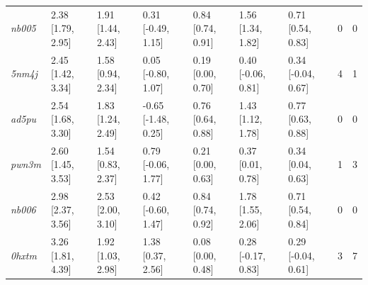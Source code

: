 \documentclass[9pt,lineno,final]{elife}
\begin{document}
\begin{table}[tb!]
\begin{center}
\begin{threeparttable}
\begin{tabular}{@{}lllllllll@{}}
\textit{nb005} & 2.38 [1.79, 2.95] & 1.91 [1.44, 2.43] & 0.31 [-0.49, 1.15] & 0.84 [0.74, 0.91] & 1.56 [1.34, 1.82] & 0.71 [0.54, 0.83] & 0 & 0 \\
\textit{5nm4j} & 2.45 [1.42, 3.34] & 1.58 [0.94, 2.34] & 0.05 [-0.80, 1.07] & 0.19 [0.00, 0.70] & 0.40 [-0.06, 0.81] & 0.34 [-0.04, 0.67] & 4 & 1 \\
\textit{ad5pu} & 2.54 [1.68, 3.30] & 1.83 [1.24, 2.49] & -0.65 [-1.48, 0.25] & 0.76 [0.64, 0.88] & 1.43 [1.12, 1.78] & 0.77 [0.63, 0.88] & 0 & 0 \\
\textit{pwn3m} & 2.60 [1.45, 3.53] & 1.54 [0.83, 2.37] & 0.79 [-0.06, 1.77] & 0.21 [0.00, 0.63] & 0.37 [0.01, 0.78] & 0.34 [0.04, 0.63] & 1 & 3 \\
\textit{nb006} & 2.98 [2.37, 3.56] & 2.53 [2.00, 3.10] & 0.42 [-0.60, 1.47] & 0.84 [0.74, 0.92] & 1.78 [1.55, 2.06] & 0.71 [0.54, 0.84] & 0 & 0 \\
\textit{0hxtm} & 3.26 [1.81, 4.39] & 1.92 [1.03, 2.98] & 1.38 [0.37, 2.56] & 0.08 [0.00, 0.48] & 0.28 [-0.17, 0.83] & 0.29 [-0.04, 0.61] & 3 & 7 \\ \bottomrule
\end{tabular}
\end{threeparttable}
\end{center}
\end{table}
\end{document}
